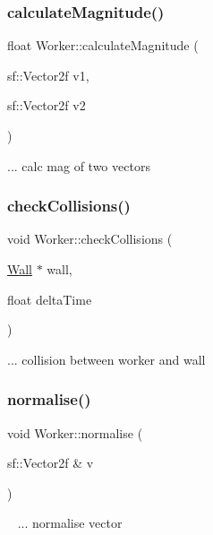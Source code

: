 \subsubsection{\texorpdfstring{calculate\+Magnitude()}{calculateMagnitude()}\hspace{0.1cm}{\footnotesize\ttfamily [2/2]}}
{\footnotesize\ttfamily float Worker\+::calculate\+Magnitude (\begin{DoxyParamCaption}\item[{sf\+::\+Vector2f}]{v1,  }\item[{sf\+::\+Vector2f}]{v2 }\end{DoxyParamCaption})}

... calc mag of two vectors\mbox{\label{class_worker_aa28cb0d23b4fc8e4a9480bab8d4724cf}} 
\subsubsection{\texorpdfstring{check\+Collisions()}{checkCollisions()}}
{\footnotesize\ttfamily void Worker\+::check\+Collisions (\begin{DoxyParamCaption}\item[{\mbox{\hyperlink{class_wall}{Wall}} $\ast$}]{wall,  }\item[{float}]{delta\+Time }\end{DoxyParamCaption})}

... collision between worker and wall\mbox{\label{class_worker_ae9b32488617a0086772afd11529e3014}} 
\subsubsection{\texorpdfstring{normalise()}{normalise()}}
{\footnotesize\ttfamily void Worker\+::normalise (\begin{DoxyParamCaption}\item[{sf\+::\+Vector2f \&}]{v }\end{DoxyParamCaption})}

~\newline
... normalise vector\mbox{\label{class_worker_a6f0cfcb460a9bc7fa3b2f1fa5ecc8b8a}} 
